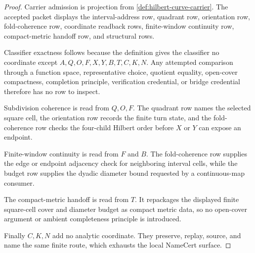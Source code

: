 \begin{proof}
Carrier admission is projection from \autoref{def:hilbert-curve-carrier}. The accepted packet displays the interval-address row, quadrant row, orientation row, fold-coherence row, coordinate readback rows, finite-window continuity row, compact-metric handoff row, and structural rows.

Classifier exactness follows because the definition gives the classifier no coordinate except $A,Q,O,F,X,Y,B,T,C,K,N$. Any attempted comparison through a function space, representative choice, quotient equality, open-cover compactness, completion principle, verification credential, or bridge credential therefore has no row to inspect.

Subdivision coherence is read from $Q,O,F$. The quadrant row names the selected square cell, the orientation row records the finite turn state, and the fold-coherence row checks the four-child Hilbert order before $X$ or $Y$ can expose an endpoint.

Finite-window continuity is read from $F$ and $B$. The fold-coherence row supplies the edge or endpoint adjacency check for neighboring interval cells, while the budget row supplies the dyadic diameter bound requested by a continuous-map consumer.

The compact-metric handoff is read from $T$. It repackages the displayed finite square-cell cover and diameter budget as compact metric data, so no open-cover argument or ambient completeness principle is introduced.

Finally $C,K,N$ add no analytic coordinate. They preserve, replay, source, and name the same finite route, which exhausts the local NameCert surface.
\end{proof}

